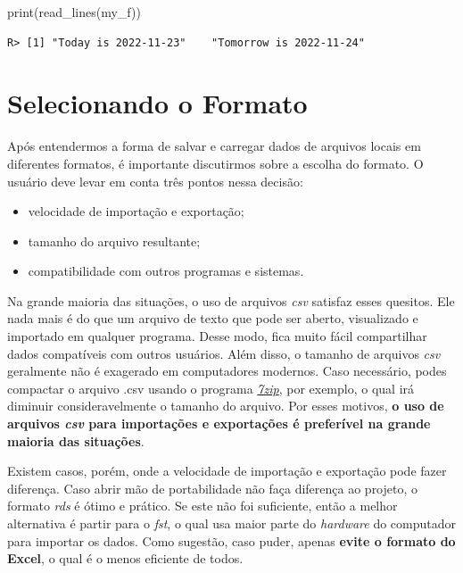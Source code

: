 \documentclass[
  11pt,
]{book}
\newenvironment{Shaded}{\begin{snugshade}}{\end{snugshade}}
\newcommand{\FunctionTok}[1]{\textcolor[rgb]{0,0,0}{#1}}
\newcommand{\NormalTok}[1]{#1}
\providecommand{\tightlist}{%
  \setlength{\itemsep}{0pt}\setlength{\parskip}{0pt}}
\begin{document}
\begin{Shaded}
\begin{Highlighting}[]
\FunctionTok{print}\NormalTok{(}\FunctionTok{read\_lines}\NormalTok{(my\_f))}
\end{Highlighting}
\end{Shaded}

\begin{verbatim}
R> [1] "Today is 2022-11-23"    "Tomorrow is 2022-11-24"
\end{verbatim}

\hypertarget{selecionando-o-formato}{%
\section{Selecionando o Formato}\label{selecionando-o-formato}}

Após entendermos a forma de salvar e carregar dados de arquivos locais em diferentes formatos, é importante discutirmos sobre a escolha do formato. O usuário deve levar em conta três pontos nessa decisão:

\begin{itemize}
\tightlist
\item
  velocidade de importação e exportação;
\item
  tamanho do arquivo resultante;
\item
  compatibilidade com outros programas e sistemas.
\end{itemize}

Na grande maioria das situações, o uso de arquivos \emph{csv} satisfaz esses quesitos. Ele nada mais é do que um arquivo de texto que pode ser aberto, visualizado e importado em qualquer programa. Desse modo, fica muito fácil compartilhar dados compatíveis com outros usuários. Além disso, o tamanho de arquivos \emph{csv} geralmente não é exagerado em computadores modernos. Caso necessário, podes compactar o arquivo .csv usando o programa \href{https://www.7-zip.org/}{\emph{7zip}}, por exemplo, o qual irá diminuir consideravelmente o tamanho do arquivo. Por esses motivos, \textbf{o uso de arquivos \emph{csv} para importações e exportações é preferível na grande maioria das situações}. 

Existem casos, porém, onde a velocidade de importação e exportação pode fazer diferença. Caso abrir mão de portabilidade não faça diferença ao projeto, o formato \emph{rds} é ótimo e prático. Se este não foi suficiente, então a melhor alternativa é partir para o \emph{fst}, o qual usa maior parte do \emph{hardware} do computador para importar os dados. Como sugestão, caso puder, apenas \textbf{evite o formato do Excel}, o qual é o menos eficiente de todos.
\end{document}
